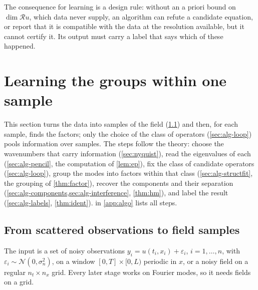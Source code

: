 \documentclass[11pt]{article}
\theoremstyle{plain}
\theoremstyle{definition}
\theoremstyle{remark}
\newcommand{\ring}{\mathcal{R}}            %
\newcommand{\noise}{\sigma_{n}}             %
\newcommand{\Normal}{\mathcal{N}}
\begin{document}
The consequence for learning is a design rule: without an a priori bound on $\dim\ring u$, which data never
supply, an algorithm can refute a candidate equation, or report that it is compatible with the data at
the resolution available, but it cannot certify it. Its output must carry a label that says which of these
happened.



\section{Learning the groups within one sample}\label{sec:within}
\label{sec:algorithm}
This section turns the data into samples of the field (\cref{sec:alg-interp}) and then, for each sample, finds the
factors; only the choice of the class of operators (\cref{sec:alg-loop}) pools information over samples. The steps
follow the theory: choose the
wavenumbers that carry information (\cref{sec:nyquist}), read the eigenvalues of each (\cref{sec:alg-pencil}, the
computation of \cref{lem:ep}), fix the class of candidate operators (\cref{sec:alg-loop}), group the modes into factors
within that class (\cref{sec:alg-structfit}, the grouping of \cref{thm:factor}), recover the components and their separation
(\cref{sec:alg-components,sec:alg-interference}, \cref{thm:hm}), and label the result (\cref{sec:alg-labels},
\cref{thm:ident}).  in \cref{app:algo} lists all steps.

\subsection{From scattered observations to field samples}\label{sec:alg-interp}
The input is a set of noisy observations $y_i=u(t_i,x_i)+\varepsilon_i$, $i=1,\dots,n$, with
$\varepsilon_i\sim\Normal(0,\noise^2)$, on a window $[0,T]\times[0,L)$ periodic in $x$, or a noisy field on a
regular $n_t\times n_x$ grid. Every later stage works on Fourier modes, so it needs fields on a grid.
\end{document}
